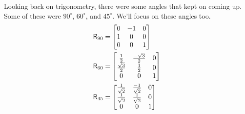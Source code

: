 \documentclass{ximera}
\begin{document}
Looking back on trigonometry, there were some angles that kept on
coming up. Some of these were $90^\circ$, $60^\circ$, and $45^\circ$.
We'll focus on these angles too.
\begin{align*}
\mathsf{R}_{90} &=
\begin{bmatrix}
0 & -1 & 0\\
1 & 0 & 0\\
0 & 0 & 1
\end{bmatrix}\\
\mathsf{R}_{60} &=
\begin{bmatrix}
\frac{1}{2} & \frac{-\sqrt{3}}{2} & 0\\
\frac{\sqrt{3}}{2} & \frac{1}{2} & 0\\
0 & 0 & 1
\end{bmatrix}\\
\mathsf{R}_{45} &=
\begin{bmatrix}
\frac{1}{\sqrt{2}} & \frac{-1}{\sqrt{2}} & 0\\
\frac{1}{\sqrt{2}} & \frac{1}{\sqrt{2}} & 0\\
0 & 0 & 1
\end{bmatrix}
\end{align*}
\end{document}
